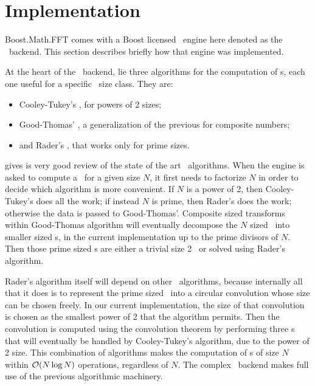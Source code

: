 \section{Implementation}\label{sec:implementation}
Boost.Math.FFT comes with a Boost licensed \fft\ engine here denoted as the
\bsl\ backend. This section describes briefly how that engine was implemented.

At the heart of the \bsl\ backend, lie three algorithms for the computation of
\dft s, each one useful for a specific \dft\ size class. They are:
\begin{itemize}
    \item Cooley-Tukey's \fft, for powers of 2 sizes;
    \item Good-Thomas' \fft, a generalization of the previous for composite
    numbers;
    \item and Rader's \fft, that works only for prime sizes.
\end{itemize}
\cite{duhamel1990} gives is very good review of the state of the art \fft\
algorithms.
When the engine is asked to compute a \dft\ for a given size $N$, it first needs
to factorize $N$ in order to decide which algorithm is more convenient.
If $N$ is a power of 2, then Cooley-Tukey's does all the work; if instead $N$
is prime, then Rader's does the work; otherwise the data is passed to
Good-Thomas'. Composite sized transforms within Good-Thomas algorithm will
eventually decompose the $N$ sized \dft\ into smaller sized \dft s, in the
current implementation up to the prime divisors of $N$. Then those prime sized
\dft s are either a trivial size 2 \dft\ or solved using Rader's algorithm.

Rader's algorithm itself will depend on other \fft\ algorithms, because
internally all that it does is to represent the prime sized \dft\ into a 
circular convolution whose size can be chosen freely. In our current
implementation, the size of that convolution is chosen as the smallest power of
2 that the algorithm permits. Then the convolution is computed using the
convolution theorem by performing three \fft s that will eventually be handled
by Cooley-Tukey's algorithm, due to the power of 2 size.
This combination of algorithms makes the computation of \dft s of size
$N$ within $\mathcal{O}(N \log N)$ operations, regardless of $N$.
The complex \bsl\ backend makes full use of the previous algorithmic machinery.

